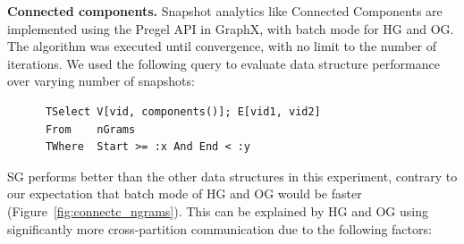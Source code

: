 
{\bf Connected components.} Snapshot analytics like Connected
Components are implemented using the Pregel API in GraphX, with batch
mode for HG and OG.  The algorithm was executed until convergence,
with no limit to the number of iterations.  We used the following
query to evaluate data structure performance over varying number of
snapshots:

\begin{small}
\begin{verbatim}
      TSelect V[vid, components()]; E[vid1, vid2]
      From    nGrams
      TWhere  Start >= :x And End < :y
\end{verbatim}
\end{small}


SG performs better than the other data structures in this experiment,
contrary to our expectation that batch mode of HG and OG would be
faster (Figure~\ref{fig:connectc_ngrams}).  This can be explained by
HG and OG using significantly more cross-partition communication due
to the following factors:

